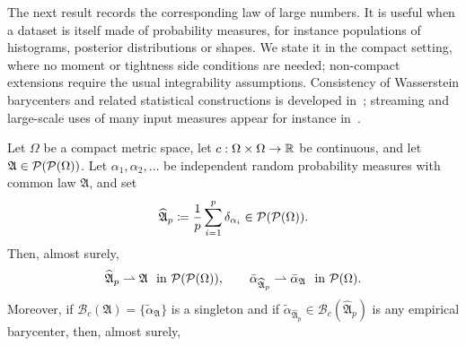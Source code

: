 The next result records the corresponding law of large numbers. It is useful when a dataset is itself made of probability measures, for instance populations of histograms, posterior distributions or shapes. We state it in the compact setting, where no moment or tightness side conditions are needed; non-compact extensions require the usual integrability assumptions. Consistency of Wasserstein barycenters and related statistical constructions is developed in~\cite{boissard2015distribution,leGouic2016existence,zemel2017fr}; streaming and large-scale uses of many input measures appear for instance in~\cite{staib2017parallel,srivastava2015wasp,srivastava2018scalable}.

\begin{prop}\label{prop-wow-barycenter-lln}
	Let $\Omega$ be a compact metric space, let $c:\Omega\times\Omega\to\mathbb{R}$ be continuous, and let $\mathfrak A\in\mathcal{P}(\mathcal{P}(\Omega))$. Let $\alpha_1,\alpha_2,\ldots$ be independent random probability measures with common law $\mathfrak A$, and set
	\[
		\widehat{\mathfrak A}_p
		\coloneqq
		\frac1p\sum_{i=1}^p\delta_{\alpha_i}
		\in\mathcal{P}(\mathcal{P}(\Omega)).
	\]
	Then, almost surely,
	\begin{equation}\label{eq-wow-empirical-law-lln}
		\widehat{\mathfrak A}_p \rightharpoonup \mathfrak A\ \text{ in }\mathcal{P}(\mathcal{P}(\Omega)),
		\qquad
		\bar\alpha_{\widehat{\mathfrak A}_p}\rightharpoonup\bar\alpha_{\mathfrak A}\ \text{ in }\mathcal{P}(\Omega).
	\end{equation}
	Moreover, if $\mathcal B_c(\mathfrak A)=\{\widetilde\alpha_{\mathfrak A}\}$ is a singleton and if $\widetilde\alpha_{\widehat{\mathfrak A}_p}\in\mathcal B_c(\widehat{\mathfrak A}_p)$ is any empirical barycenter, then, almost surely,
\end{prop}

